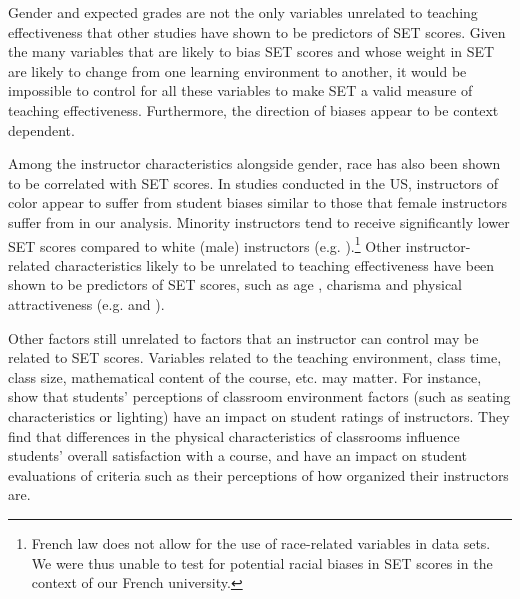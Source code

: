 \documentclass[12pt]{article}
\begin{document}
Gender and expected grades are not the only variables unrelated to teaching effectiveness that other studies have shown to be predictors of SET scores. Given the many variables that are likely to bias SET scores and whose weight in SET are likely to change from one learning environment to another, it would be impossible to control for all these variables to make SET a valid measure of teaching effectiveness. Furthermore, the direction of biases appear to be context dependent. 

Among the instructor characteristics alongside gender, race has also been shown to be correlated with SET scores.  In studies conducted in the US, instructors of color appear to suffer from student biases similar to those that female instructors suffer from in our analysis. Minority instructors tend to receive significantly lower SET scores compared to white (male) instructors (e.g. \citet{Merritt2008}).\footnote{French law does not allow for the use of race-related variables in data sets. We were thus unable to test for potential racial biases in SET scores in the context of our French university.} Other instructor-related characteristics likely to be unrelated to teaching effectiveness have been shown to be predictors of SET scores, such as age \citep{Arbuckle2003}, charisma \citep{Shevlin2000} and physical attractiveness (e.g. \citet{Riniolo2006} and \citet{Hamermesh2005}).  

Other factors still unrelated to factors that an instructor can control may be related to SET scores.  Variables related to the teaching environment, class time, class size, mathematical content of the course, etc. may matter. For instance, \citet{Hill2010} show that students' perceptions of classroom environment factors (such as seating characteristics or lighting) have an impact on student ratings of instructors. They find that differences in the physical characteristics of classrooms influence students' overall satisfaction with a course, and have an impact on student evaluations of criteria such as their perceptions of how organized their instructors are.
\end{document}
